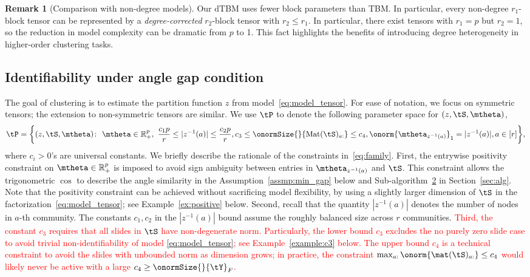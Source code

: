 \documentclass[lettersize,onecolumn,journal]{IEEEtran}
\theoremstyle{definition}
\theoremstyle{definition}
\newtheorem{rmk}{Remark}
\begin{document}
\begin{rmk}[Comparison with non-degree models]
Our dTBM uses fewer block parameters than TBM. In particular, every non-degree $r_1$-block tensor can be represented by a \emph{degree-corrected} $r_2$-block tensor with $r_2\leq r_1$. In particular, there exist tensors with $r_1=p$ but $r_2=1$, so the reduction in model complexity can be dramatic from $p$ to 1. This fact highlights the benefits of introducing degree heterogeneity in higher-order clustering tasks.
\end{rmk}


\subsection{Identifiability under angle gap condition}\label{subsec:identify}
The goal of clustering is to estimate the partition function $z$ from model~\eqref{eq:model_tensor}. For ease of notation, we focus on symmetric tensors; the extension to non-symmetric tensors are similar. We use $\tP$ to denote the following parameter space for $(z,\tS,\mtheta)$,
\begin{align}\label{eq:family}
\tP=\bigg\{(z,\tS,\mtheta)\colon  \ \mtheta\in\mathbb{R}^p_{+},\ 
{c_1p\over r}\leq |z^{-1}(a)|\leq {c_2 p\over r}, c_3\leq \onormSize{}{\text{Mat}(\tS)_{a:}}\leq c_4, \onorm{\mtheta_{z^{-1}(a)}}_1=|z^{-1}(a)|, a\in[r]\bigg\},
\end{align}
\normalsize
where $c_i>0$'s are universal constants. We briefly describe the rationale of the constraints in~\eqref{eq:family}. 
First, the entrywise positivity constraint on  $\mtheta\in\mathbb{R}^p_{+}$ is imposed to avoid sign ambiguity between entries in $\mtheta_{z^{-1}(a)}$ and $\tS$. This constraint allows the trigonometric $\cos$ to describe the angle similarity in the Assumption~\ref{assmp:min_gap} below and Sub-algorithm~\hyperref[alg:main]{2} in Section~\ref{sec:alg}. Note that the positivity constraint can be achieved without sacrificing model flexibility, by using a slightly larger dimension of $\tS$ in the factorization~\eqref{eq:model_tensor}; see Example~\ref{ex:positive} below. Second, recall that the quantity $|z^{-1}(a)|$ denotes the number of nodes in $a$-th community. The constants $c_1, c_2$ in the $|z^{-1}(a)|$ bound assume the roughly balanced size across $r$ communities. \textcolor{red}{Third, the constant $c_3$ requires that all slides in $\tS$ have non-degenerate norm. Particularly, the lower bound $c_3$ excludes the no purely zero slide case to avoid trivial non-identifiability of model \eqref{eq:model_tensor}; see Example~\ref{example:c3} below. The upper bound $c_4$ is a technical constraint to avoid the slides with unbounded norm as dimension grows; in practice, the constraint $\max_{a:} \onorm{\mat(\tS)_{a:}} \leq c_4$ would likely never be active with a large $c_4 \geq \onormSize{}{\tY}_F$. } %
\end{document}
